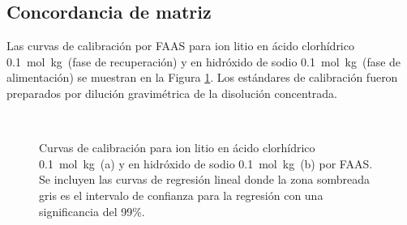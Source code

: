\subsection{Concordancia de matriz}\label{sec:liexternal}
Las curvas de calibración por \ac{FAAS} para ion litio en ácido clorhídrico 0.1~mol~kg\mnn\ (fase de recuperación) y en hidróxido de sodio 0.1~mol~kg\mnn\ (fase de alimentación) se muestran en la Figura \ref{fig:LitCurve}. Los estándares de calibración fueron preparados por dilución gravimétrica de la disolución concentrada.

\begin{figure}[H]
    \centering
    \\
    \caption[Curvas de calibración para ion litio en medio ácido y en medio alcalino.]{Curvas de calibración para ion litio en ácido clorhídrico 0.1~mol~kg\mnn\ (a) y en hidróxido de sodio 0.1~mol~kg\mnn\ (b) por FAAS. Se incluyen las curvas de regresión lineal donde la zona sombreada gris es el intervalo de confianza para la regresión con una significancia del 99\%.}
    \label{fig:LitCurve}
\end{figure}
